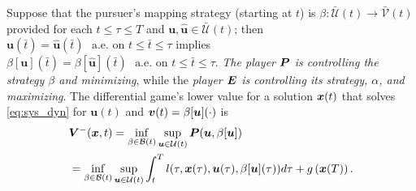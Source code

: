 Suppose that the pursuer's mapping strategy (starting at $t$) is $\beta: \mathcal{\bar{U}}({t}) \rightarrow \mathcal{\bar{V}}({t})$ provided for each $t \le \tau \le T$ and $\bm{u}, \hat{\bm{u}} \in \mathcal{\bar{U}}({t})$; then $\bm{u}(\bar{t}) = \hat{\bm{u}}(\bar{t}) \,\, \text{ a.e. on } t \le \bar{t}  \le \tau$ implies $\beta[\bm{u}](\bar{t}) = \beta[\hat{\bm{u}}](\bar{t}) \,\, \text{ a.e. on } t \le \bar{t}  \le \tau$. \textit{The player $\bm{P}$ is controlling the strategy $\beta$ and minimizing}, while the \textit{player $\bm{E}$ is controlling its strategy, $\alpha$, and maximizing}. %
%
The differential game's lower value for a solution $\bm{x}(t)$ that solves \eqref{eq:sys_dyn} for $\bm{u}(t)$ and $\bm{v}(t) = \beta[\bm{u}](\cdot)$ is 
%
\begin{align}
	&\lowervalue(\state, t) = \inf_{\beta \in \mathcal{B}(t)} \sup_{\bm{u} \in \mathcal{U}(t)} \bm{P}(\bm{u}, \beta[\bm{u}]) \nonumber \\
	&=  \inf_{\beta \in \mathcal{B}(t)} \sup_{\bm{u} \in \mathcal{U}(t)} %
	\int_{t}^{T} l(\tau, \bm{x}(\tau), \bm{u}(\tau), \beta[\bm{u}](\tau)) d\tau + g\left(\bm{x}(T)\right). %
	\label{eq:value_lower}
\end{align}
%
%

